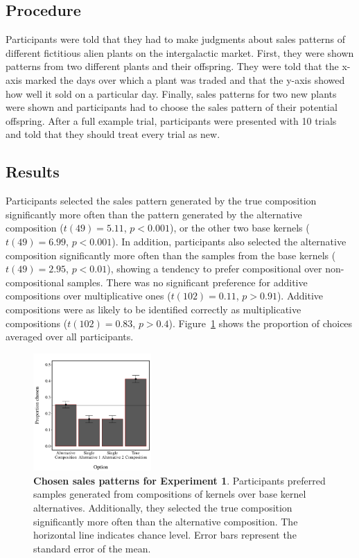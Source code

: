 \documentclass[10pt,letterpaper]{article}
\begin{document}
\subsection{Procedure}
Participants were told that they had to make judgments about sales patterns of different fictitious alien plants on the intergalactic market. First, they were shown patterns from two different plants and their offspring. They were told that the x-axis marked the days over which a plant was traded and that the y-axis showed how well it sold on a particular day. Finally, sales patterns for two new plants were shown and participants had to choose the sales pattern of their potential offspring. After a full example trial, participants were presented with 10 trials and told that they should treat every trial as new.
 
\subsection{Results}

Participants selected the sales pattern generated by the true composition significantly more often than the pattern generated by the alternative composition ($t(49)=5.11$, $p<0.001$), or the other two base kernels ($t(49)=6.99$, $p<0.001$). In addition, participants also selected the alternative composition significantly more often than the samples from the base kernels ($t(49)=2.95$, $p<0.01$), showing a tendency to prefer compositional over non-compositional samples. There was no significant preference for additive compositions over multiplicative ones ($t(102)=0.11$, $p>0.91$). Additive compositions were as likely to be identified correctly  as multiplicative compositions ($t(102)=0.83$, $p>0.4$). Figure~\ref{fig:results1} shows the proportion of choices averaged over all participants.
\begin{figure}[ht!]
\centering
\includegraphics[width=0.4\textwidth]{results1.pdf}
\caption{\textbf{Chosen sales patterns for Experiment 1}. Participants preferred samples generated from compositions of kernels over base kernel alternatives. Additionally, they selected the true composition significantly more often than the alternative composition. The horizontal line indicates chance level. Error bars represent the standard error of the mean.}
\label{fig:results1}
\end{figure}
\end{document}
